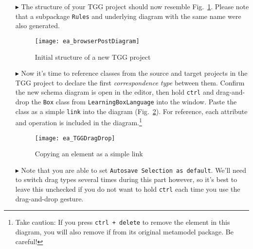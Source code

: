 \begin{itemize}
\item[$\blacktriangleright$] The structure of your TGG project should now resemble Fig.~\ref{ea:new_tgg_project}. Please note that a subpackage \texttt{Rules}
and underlying diagram with the same name were also generated.

\begin{figure}[htbp]
\begin{center}
  \texttt{[image: ea\_browserPostDiagram]}
  \caption{Initial structure of a new TGG project}  
  \label{ea:new_tgg_project}
\end{center}
\end{figure}
\end{itemize}
\clearpage

\begin{itemize}

\item[$\blacktriangleright$] Now it's time to reference classes from the source and target projects in the TGG project to declare the first \emph{correspondence
type} between them. Confirm the new schema diagram is open in the editor, then hold \texttt{ctrl} and drag-and-drop the \texttt{Box} class from
\texttt{Learning\-Box\-Language} into the window. Paste the class as a simple \texttt{link} into the diagram (Fig.~\ref{ea:TGGdragDrop}). For reference, each
attribute and operation is included in the diagram.\footnote{Take caution: If you press \texttt{ctrl + delete} to remove the element in this diagram,
you will also remove if from its original metamodel package. Be careful!}

\vspace{0.5cm}

\begin{figure}[htbp]
\begin{center}
  \texttt{[image: ea\_TGGDragDrop]}
  \caption{Copying an element as a simple link} 
  \label{ea:TGGdragDrop}
\end{center}
\end{figure}

\item[$\blacktriangleright$] Note that you are able to set \texttt{Autosave Selection as default}. We'll need to switch drag types several times during this
part however, so it's best to leave this unchecked if you do not want to hold \texttt{ctrl} each time you use the drag-and-drop gesture.

\vspace{0.5cm}


\end{itemize}
